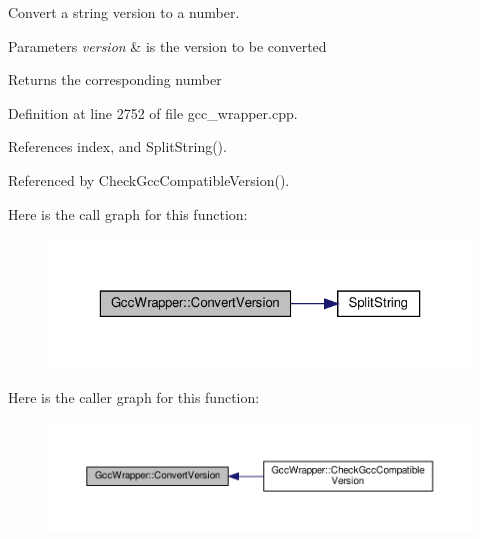 Convert a string version to a number. 


\begin{DoxyParams}{Parameters}
{\em version} & is the version to be converted \\
\hline
\end{DoxyParams}
\begin{DoxyReturn}{Returns}
the corresponding number 
\end{DoxyReturn}


Definition at line 2752 of file gcc\+\_\+wrapper.\+cpp.



References index, and Split\+String().



Referenced by Check\+Gcc\+Compatible\+Version().

Here is the call graph for this function\+:
\nopagebreak
\begin{figure}[H]
\begin{center}
\leavevmode
\includegraphics[width=323pt]{d4/dbf/classGccWrapper_a49f7bc99f88ca39191d6dc27bb658097_cgraph}
\end{center}
\end{figure}
Here is the caller graph for this function\+:
\nopagebreak
\begin{figure}[H]
\begin{center}
\leavevmode
\includegraphics[width=350pt]{d4/dbf/classGccWrapper_a49f7bc99f88ca39191d6dc27bb658097_icgraph}
\end{center}
\end{figure}
\mbox{\label{classGccWrapper_ac2cc3fad0dd5560c7dc07e56bf19ec02}} 

